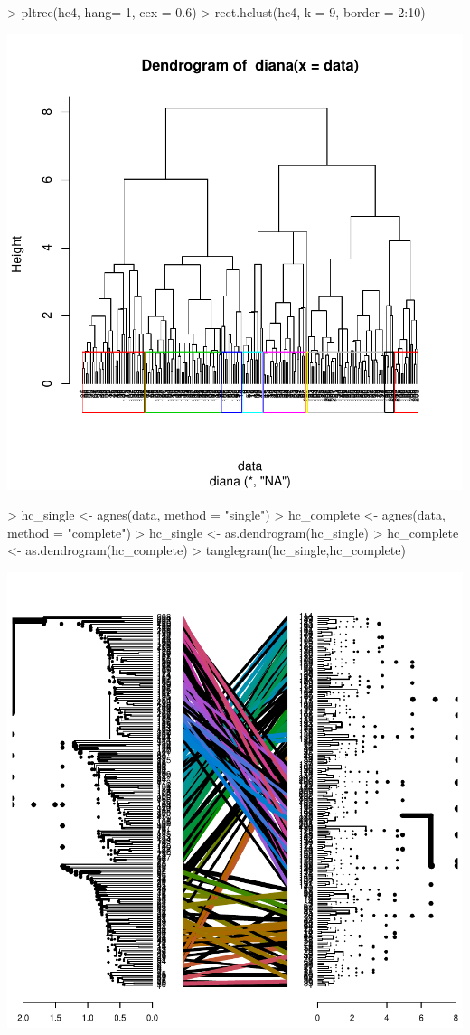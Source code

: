\documentclass [a4paper] {article}
\begin{document}
\begin{Schunk}
\begin{Sinput}
> pltree(hc4, hang=-1, cex = 0.6)
> rect.hclust(hc4, k = 9, border = 2:10)
\end{Sinput}
\end{Schunk}
\includegraphics{entrega-jerarquico_5}
\begin{Schunk}
\begin{Sinput}
> hc_single <- agnes(data, method = "single")
> hc_complete <- agnes(data, method = "complete")
> hc_single <- as.dendrogram(hc_single)
> hc_complete <- as.dendrogram(hc_complete)
> tanglegram(hc_single,hc_complete)
\end{Sinput}
\end{Schunk}
\includegraphics{entrega-jerarquico_6}
\end{document}
